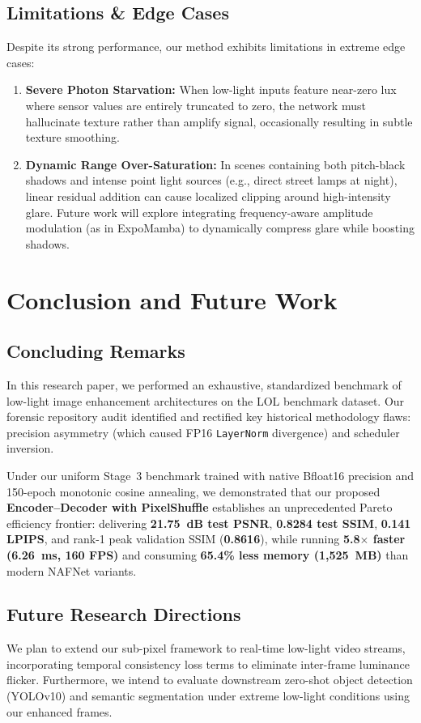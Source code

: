 \documentclass[journal,onecolumn,11pt]{IEEEtran}
\begin{document}
\subsection{Limitations \& Edge Cases}
Despite its strong performance, our method exhibits limitations in extreme edge cases:
\begin{enumerate}
    \item \textbf{Severe Photon Starvation:} When low-light inputs feature near-zero lux where sensor values are entirely truncated to zero, the network must hallucinate texture rather than amplify signal, occasionally resulting in subtle texture smoothing.
    \item \textbf{Dynamic Range Over-Saturation:} In scenes containing both pitch-black shadows and intense point light sources (e.g., direct street lamps at night), linear residual addition can cause localized clipping around high-intensity glare. Future work will explore integrating frequency-aware amplitude modulation (as in ExpoMamba) to dynamically compress glare while boosting shadows.
\end{enumerate}

\section{Conclusion and Future Work}

\subsection{Concluding Remarks}
In this research paper, we performed an exhaustive, standardized benchmark of low-light image enhancement architectures on the LOL benchmark dataset. Our forensic repository audit identified and rectified key historical methodology flaws: precision asymmetry (which caused FP16 \texttt{LayerNorm} divergence) and scheduler inversion. 

Under our uniform Stage~3 benchmark trained with native Bfloat16 precision and 150-epoch monotonic cosine annealing, we demonstrated that our proposed \textbf{Encoder--Decoder with PixelShuffle} establishes an unprecedented Pareto efficiency frontier: delivering \textbf{21.75~dB test PSNR}, \textbf{0.8284 test SSIM}, \textbf{0.141 LPIPS}, and rank-1 peak validation SSIM (\textbf{0.8616}), while running \textbf{5.8$\times$ faster (6.26~ms, 160 FPS)} and consuming \textbf{65.4\% less memory (1,525~MB)} than modern NAFNet variants.

\subsection{Future Research Directions}
We plan to extend our sub-pixel framework to real-time low-light video streams, incorporating temporal consistency loss terms to eliminate inter-frame luminance flicker. Furthermore, we intend to evaluate downstream zero-shot object detection (YOLOv10) and semantic segmentation under extreme low-light conditions using our enhanced frames.
\end{document}
